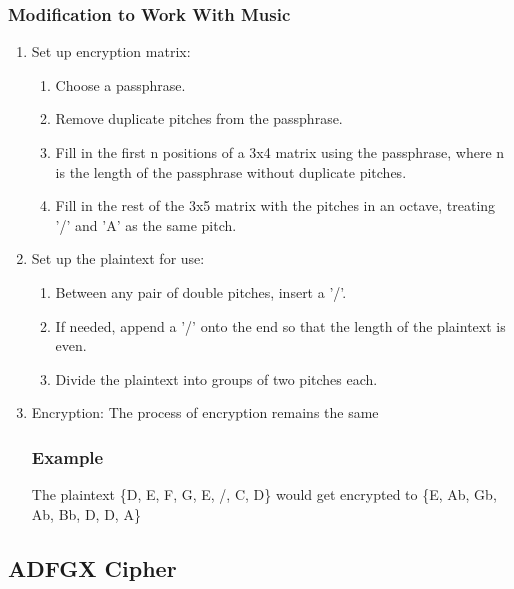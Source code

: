 \documentclass[14pt]{article}
\begin{document}
    	\subsubsection{Modification to Work With Music}
    	\begin{enumerate}
    		\item Set up encryption matrix:
    			\begin{enumerate}
    				\item Choose a passphrase.
    
    				\item Remove duplicate pitches from the passphrase.
    
    				\item Fill in the first n positions of a 3x4 matrix using the passphrase, where n is the length of the passphrase without duplicate pitches.
    
    				\item Fill in the rest of the 3x5 matrix with the pitches in an octave, treating '/' and 'A' as the same pitch.
    			\end{enumerate}
    
    		\item Set up the plaintext for use:
    			\begin{enumerate}
    				\item Between any pair of double pitches, insert a '/'.
    
    				\item If needed, append a '/' onto the end so that the length of the plaintext is even.
    
    				\item Divide the plaintext into groups of two pitches each.
    			\end{enumerate}
    
    		\item Encryption: The process of encryption remains the same
    
    			\subsubsection{Example}
    			The plaintext \{D, E, F, G, E, /, C, D\} would get encrypted to \{E, Ab, Gb,
    			Ab, Bb, D, D, A\}
    	\end{enumerate}

	\subsection{ADFGX Cipher}
\end{document}
